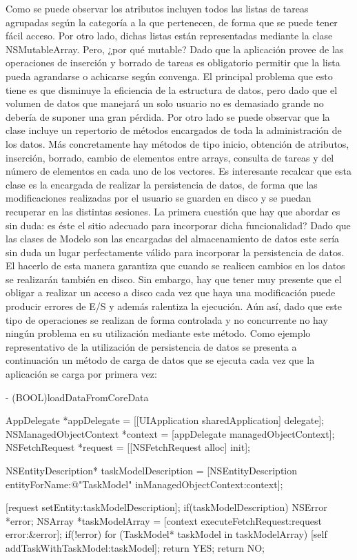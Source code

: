 \documentclass[parskip=half*]{scrartcl}
\begin{document}
Como se puede observar los atributos incluyen todos las listas de tareas agrupadas seg\'un la categor\'ia a la que pertenecen, de forma que se puede tener f\'acil acceso. Por otro lado, dichas listas est\'an representadas mediante la clase NSMutableArray. Pero, ¿por qu\'e mutable? Dado que la aplicaci\'on provee de las operaciones de inserci\'on y borrado de tareas es obligatorio permitir que la lista pueda agrandarse o achicarse seg\'un convenga. El principal problema que esto tiene es que disminuye la eficiencia de la estructura de datos, pero dado que el volumen de datos que manejar\'a un solo usuario no es demasiado grande no deber\'ia de suponer una gran p\'erdida.
Por otro lado se puede observar que la clase incluye un repertorio de m\'etodos encargados de toda la administraci\'on de los datos. M\'as concretamente hay m\'etodos de tipo inicio, obtenci\'on de atributos, inserci\'on, borrado, cambio de elementos entre arrays, consulta de tareas y del n\'umero de elementos en cada uno de los vectores.
Es interesante recalcar que esta clase es la encargada de realizar la persistencia de datos, de forma que las modificaciones realizadas por el usuario se guarden en disco y se puedan recuperar en las distintas sesiones. La primera cuesti\'on que hay que abordar es sin duda: \textquestiondown es \'este el sitio adecuado para incorporar dicha funcionalidad? Dado que las clases de Modelo son las encargadas del almacenamiento de datos este ser\'ia sin duda un lugar perfectamente v\'alido para incorporar la persistencia de datos. El hacerlo de esta manera garantiza que cuando se realicen cambios en los datos se realizar\'an tambi\'en en disco. Sin embargo, hay que tener muy presente que el obligar a realizar un acceso a disco cada vez que haya una modificaci\'on puede producir errores de E/S y adem\'as ralentiza la ejecuci\'on. A\'un as\'i, dado que este tipo de operaciones se realizan de forma controlada y no concurrente no hay ning\'un problema en su utilizaci\'on mediante este m\'etodo.
Como ejemplo representativo de la utilizaci\'on de persistencia de datos se presenta a continuaci\'on un m\'etodo de carga de datos que se ejecuta cada vez que la aplicaci\'on se carga por primera vez:

\begin{verbatimtab}
- (BOOL)loadDataFromCoreData
{
    AppDelegate *appDelegate = [[UIApplication sharedApplication] delegate];
    NSManagedObjectContext *context = [appDelegate managedObjectContext];
    NSFetchRequest *request = [[NSFetchRequest alloc] init];
    
    NSEntityDescription* taskModelDescription = 
    [NSEntityDescription entityForName:@"TaskModel" inManagedObjectContext:context];

    [request setEntity:taskModelDescription];
    if(taskModelDescription){
        NSError *error;
        NSArray *taskModelArray = [context executeFetchRequest:request error:&error];
        if(!error){
            for (TaskModel* taskModel in taskModelArray)
                [self addTaskWithTaskModel:taskModel];
            return YES;
        }
    }
    return NO;
}
\end{verbatimtab}
\end{document}
